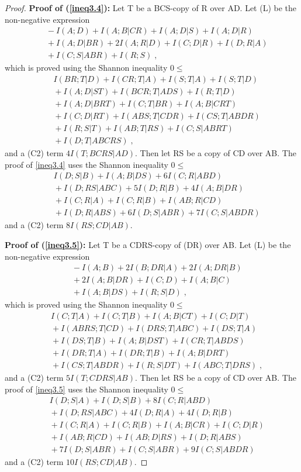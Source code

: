 \documentclass[10pt,journal]{IEEEtran}
\begin{document}
\begin{proof}
{\bf Proof of (\ref{ineq3.4}):} Let T be a BCS-copy of R over AD.  Let (L) be the non-negative expression
\begin{align*}
&\ \  -I(A;D)+I(A;B|CR)+I(A;D|S)+I(A;D|R)\\
&\ \  +I(A;D|BR)+2I(A;R|D)+I(C;D|R)+I(D;R|A)\\
&\ \  +I(C;S|ABR)+I(R;S) \; ,
\end{align*}
which is proved using the Shannon inequality $0\leq $
\begin{align*}
&\ \  I(BR;T|D) + I(CR;T|A)+ I(S;T|A)+ I(S;T|D)\\
&\ \        + I(A;D|ST)+ I(BCR;T|ADS)+ I(R;T|D)\\
&\ \  + I(A;D|BRT)     + I(C;T|BR) + I(A;B|CRT)\\
&\ \      + I(C;D|RT)+ I(ABS;T|CDR)    + I(CS;T|ABDR)\\
&\ \  + I(R;S|T)  + I(AB;T|RS)+ I(C;S|ABRT)\\
&\ \ + I(D;T|ABCRS) \; ,
\end{align*}
and a (C2) term $4I(T;BCRS|AD)$.  Then let RS be a copy of CD over AB.  The proof of \eqref{ineq3.4} uses the
Shannon inequality $0\leq $
\begin{align*}
&\ \ I(D;S|B)+ I(A;B|DS)+ 6I(C;R|ABD)\\
&\ \ + I(D;RS|ABC)       + 5I(D;R|B)+ 4I(A;B|DR) \\
&\ \   + I(C;R|A)+ I(C;R|B)   + I(AB;R|CD) \\
&\ \  + I(D;R|ABS) + 6I(D;S|ABR)+ 7I(C;S|ABDR)
\end{align*}
and a (C2) term $8I(RS;CD|AB)$.

{\bf Proof of (\ref{ineq3.5}):}  Let T be a CDRS-copy of (DR) over AB.  Let (L) be the non-negative expression
\begin{align*}
&\ \ -I(A;B)+2I(B;DR|A)+2I(A;DR|B)\\
&\ \ +2I(A;B|DR)+I(C;D)+I(A;B|C)\\
&\ \ +I(A;B|DS)+I(R;S|D) \; ,
\end{align*}
which is proved using the Shannon inequality $0\leq $
\begin{align*}
&\ \ I(C;T|A)+ I(C;T|B)+ I(A;B|CT)+ I(C;D|T)\\
&\ \ + I(ABRS;T|CD) + I(DRS;T|ABC)+ I(DS;T|A)\\
&\ \ + I(DS;T|B)+ I(A;B|DST)+ I(CR;T|ABDS)\\
&\ \ + I(DR;T|A)+ I(DR;T|B)+ I(A;B|DRT)\\
&\ \ + I(CS;T|ABDR)+ I(R;S|DT)+ I(ABC;T|DRS) \; ,
\end{align*}
and a (C2) term $5I(T;CDRS|AB)$.  Then let RS be a copy of CD over AB.  The proof of \eqref{ineq3.5} uses the
Shannon inequality $0\leq $
\begin{align*}
&\ \  I(D;S|A)+ I(D;S|B)+ 8I(C;R|ABD)\\
&\ \ + I(D;RS|ABC)+ 4I(D;R|A)+ 4I(D;R|B)\\
&\ \ + I(C;R|A)+ I(C;R|B) + I(A;B|CR)+ I(C;D|R)\\
&\ \  + I(AB;R|CD)+ I(AB;D|RS)+ I(D;R|ABS)\\
&\ \   + 7I(D;S|ABR) + I(C;S|ABR)+ 9I(C;S|ABDR)
\end{align*}
and a (C2) term $10I(RS;CD|AB)$.



\end{proof}
\end{document}
